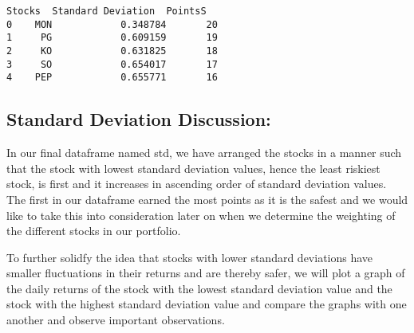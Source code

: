 \documentclass[11pt]{article}
\makeatletter
\newcommand{\boxspacing}{\kern\kvtcb@left@rule\kern\kvtcb@boxsep}
\newcommand{\prompt}[4]{
        {\ttfamily\llap{{\color{#2}[#3]:\hspace{3pt}#4}}\vspace{-\baselineskip}}
    }
\makeatother
\begin{document}
            \begin{tcolorbox}[breakable, size=fbox, boxrule=.5pt, pad at break*=1mm, opacityfill=0]
\prompt{Out}{outcolor}{9}{\boxspacing}
\begin{Verbatim}[commandchars=\\\{\}]
  Stocks  Standard Deviation  PointsS
0    MON            0.348784       20
1     PG            0.609159       19
2     KO            0.631825       18
3     SO            0.654017       17
4    PEP            0.655771       16
\end{Verbatim}
\end{tcolorbox}
        
    \hypertarget{standard-deviation-discussion}{%
\subsection{Standard Deviation
Discussion:}\label{standard-deviation-discussion}}

In our final dataframe named std, we have arranged the stocks in a
manner such that the stock with lowest standard deviation values, hence
the least riskiest stock, is first and it increases in ascending order
of standard deviation values. The first in our dataframe earned the most
points as it is the safest and we would like to take this into
consideration later on when we determine the weighting of the different
stocks in our portfolio.

To further solidfy the idea that stocks with lower standard deviations
have smaller fluctuations in their returns and are thereby safer, we
will plot a graph of the daily returns of the stock with the lowest
standard deviation value and the stock with the highest standard
deviation value and compare the graphs with one another and observe
important observations.
\end{document}
